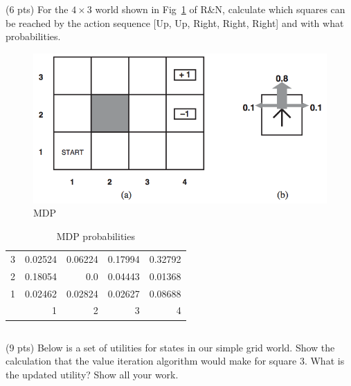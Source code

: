 \documentclass[paper=a4, fontsize=11pt]{scrartcl} %
\begin{document}
\section{}

\subsection{}
\begin{fancyquotes}
  (6 pts) For the $4\times3$ world shown in Fig~\ref{fig:mdp} of R\&N,
  calculate which squares can be reached by the action sequence [Up,
  Up, Right, Right, Right] and with what probabilities.
\end{fancyquotes}

\begin{figure}[hp]
  \centering
  \includegraphics[width=\textwidth]{mdp.png}
  \caption{MDP}
  \label{fig:mdp}
\end{figure}

\begin{table}[hp]
  \centering
  \begin{tabular}[hp]{c|rrrr}
    3 & 0.02524 & 0.06224 & 0.17994 & 0.32792 \\
    2 & 0.18054 & 0.0 & 0.04443 & 0.01368 \\
    1 & 0.02462 & 0.02824 & 0.02627 & 0.08688 \\
    \hline
    & 1 & 2 & 3 & 4
  \end{tabular}
  \caption{MDP probabilities}
  \label{tab:mdp}
\end{table}

\pagebreak

\subsection{}
\begin{fancyquotes}
  (9 pts) Below is a set of utilities for states in our simple grid
  world. Show the calculation that the value iteration algorithm would
  make for square $3$. What is the updated utility? Show all your
  work.
\end{fancyquotes}
\end{document}
